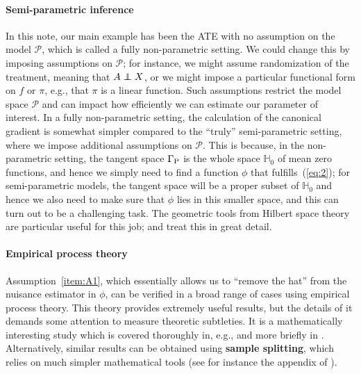 \documentclass[a4,danish]{article}
\begin{document}
\paragraph{Semi-parametric inference} In this note, our main example has been the ATE with no
assumption on the model $\mathcal{P}$, which is called a fully non-parametric setting. We could
change this by imposing assumptions on $\mathcal{P}$; for instance, we might assume randomization of
the treatment, meaning that $A \independent X$, or we might impose a particular functional form on
$f$ or $\pi$, e.g., that $\pi$ is a linear function. Such assumptions restrict the model space
$\mathcal{P}$ and can impact how efficiently we can estimate our parameter of interest. In a fully
non-parametric setting, the calculation of the canonical gradient is somewhat simpler compared to
the ``truly'' semi-parametric setting, where we impose additional assumptions on $\mathcal{P}$. This
is because, in the non-parametric setting, the tangent space $\Gamma_{\P}$ is the whole space
$\mathbb{H}_0$ of mean zero functions, and hence we simply need to find a function $\phi$ that
fulfills~(\ref{eq:2}); for semi-parametric models, the tangent space will be a proper subset of
$\mathbb{H}_0$ and hence we also need to make sure that $\phi$ lies in this smaller space, and this
can turn out to be a challenging task. The geometric tools from Hilbert space theory are particular
useful for this job; \cite{tsiatis2007semiparametric} and \cite{bickel1993efficient} treat this in
great detail.

\paragraph{Empirical process theory}
Assumption~\ref{item:A1}, which essentially allows us to ``remove the hat'' from the nuisance
estimator in $\phi$, can be verified in a broad range of cases using empirical process theory. This
theory provides extremely useful results, but the details of it demands some attention to measure
theoretic subtleties. It is a mathematically interesting study which is covered thoroughly in, e.g.,
\cite{van1996weak} and more briefly in \cite{van2000asymptotic}. Alternatively, similar results can
be obtained using \textbf{sample splitting}, which relies on much simpler mathematical tools (see
for instance the appendix of \cite{chernozhukov2018double}).
\end{document}
